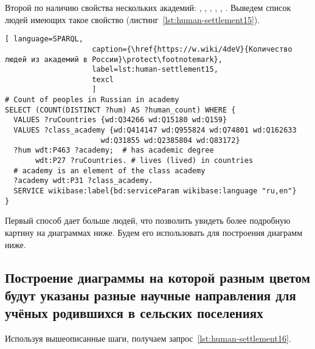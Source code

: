 Второй по наличию свойства  нескольких академий: , , , , , . Выведем список людей имеющих такое свойство (листинг~\protect\ref{lst:human-settlement15}). 

\begin{lstlisting}[ language=SPARQL, 
                    caption={\href{https://w.wiki/4deV}{Количество людей из академий в России}\protect\footnotemark},
                    label=lst:human-settlement15,
                    texcl 
                    ]
# Count of peoples in Russian in academy
SELECT (COUNT(DISTINCT ?hum) AS ?human_count) WHERE {
  VALUES ?ruCountries {wd:Q34266 wd:Q15180 wd:Q159}
  VALUES ?class_academy {wd:Q414147 wd:Q955824 wd:Q74801 wd:Q162633 
                      wd:Q31855 wd:Q2385804 wd:Q83172}
  ?hum wdt:P463 ?academy;  # has academic degree 
       wdt:P27 ?ruCountries. # lives (lived) in countries
  # academy is an element of the class academy
  ?academy wdt:P31 ?class_academy. 
  SERVICE wikibase:label{bd:serviceParam wikibase:language "ru,en"}
}
\end{lstlisting}%

Первый способ дает больше людей, что позволить увидеть более подробную картину на диаграммах ниже. Будем его использовать для построения диаграмм ниже.

\subsection{Построение диаграммы на которой разным цветом будут указаны разные научные направления для учёных родившихся в сельских поселениях}

Используя вышеописанные шаги, получаем запрос~\protect\ref{lst:human-settlement16}.


